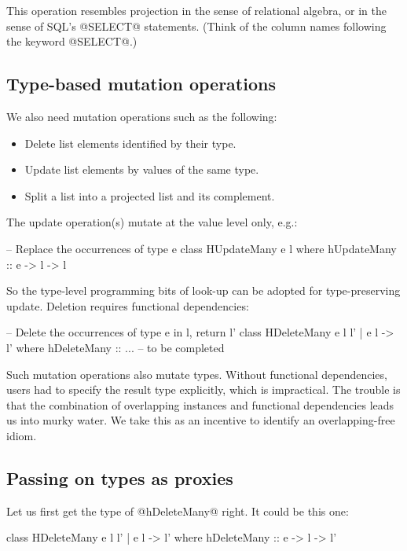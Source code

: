 \documentclass[nocopyrightspace,preprint]{sigplan-proc}
\begin{document}
This operation resembles projection in the sense of relational
algebra, or in the sense of SQL's @SELECT@ statements. (Think of the
column names following the keyword @SELECT@.)


\medskip

\subsection*{Type-based mutation operations}

We also need mutation operations such as the following:
%
\begin{itemize}
\item Delete list elements identified by their type.
\item Update list elements by values of the same type.
\item Split a list into a projected list and its complement.
\end{itemize}
%
The update operation(s) mutate at the value level only, e.g.:

\begin{code}
 -- Replace the occurrences of type e
 class  HUpdateMany  e l
  where hUpdateMany :: e -> l -> l
\end{code}

So the type-level programming bits of look-up can be adopted for
type-preserving update. Deletion requires functional dependencies:

\begin{code}
 -- Delete the occurrences of type e in l, return l'
 class  HDeleteMany e l l' | e l -> l'
  where hDeleteMany :: ... -- to be completed
\end{code}

Such mutation operations also mutate types. Without functional
dependencies, users had to specify the result type explicitly, which
is impractical. The trouble is that the combination of overlapping
instances and functional dependencies leads us into murky water.  We
take this as an incentive to identify an overlapping-free idiom.


\medskip

\subsection*{Passing on types as proxies}

Let us first get the type of @hDeleteMany@ right. It could be this one:

\begin{code}
 class  HDeleteMany e l l' | e l -> l'
  where hDeleteMany :: e -> l -> l'
\end{code}
\end{document}
